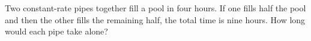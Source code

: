Two constant-rate pipes together fill a pool in four hours. If one fills half the pool and then the other fills the remaining half, the total time is nine hours. How long would each pipe take alone?
